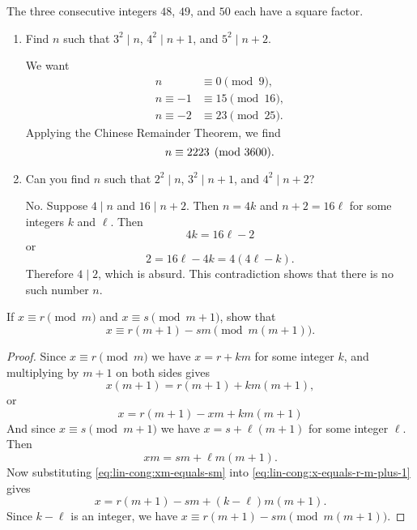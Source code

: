  The three consecutive integers $48$, $49$, and $50$ each
have a square factor.
\begin{enumerate}
\item Find $n$ such that $3^2\mid n$, $4^2\mid n+1$, and
  $5^2\mid n+2$.
  \begin{solution}
    We want
    \begin{align*}
      n&\equiv0\pmod9, \\
      n\equiv-1&\equiv15\pmod{16}, \\
      n\equiv-2&\equiv23\pmod{25}.
    \end{align*}
    Applying the Chinese Remainder Theorem, we find
    \begin{equation*}
      n\equiv2223\pmod{3600}. \qedhere
    \end{equation*}
  \end{solution}
\item Can you find $n$ such that $2^2\mid n$, $3^2\mid n+1$, and
  $4^2\mid n+2$?
  \begin{solution}
    No. Suppose $4\mid n$ and $16\mid n+2$. Then $n = 4k$ and
    $n+2 = 16\ell$ for some integers $k$ and $\ell$. Then
    \begin{equation*}
      4k = 16\ell - 2
    \end{equation*}
    or
    \begin{equation*}
      2 = 16\ell - 4k = 4(4\ell - k).
    \end{equation*}
    Therefore $4\mid 2$, which is absurd. This contradiction shows
    that there is no such number $n$.
  \end{solution}
\end{enumerate}

 If $x\equiv r\pmod{m}$ and $x\equiv s\pmod{m+1}$, show
that
\begin{equation*}
  x\equiv r(m + 1) - sm \pmod{m(m+1)}.
\end{equation*}
\begin{proof}
  Since $x\equiv r\pmod{m}$ we have $x = r + km$ for some integer $k$,
  and multiplying by $m + 1$ on both sides gives
  \begin{equation*}
    x(m + 1) = r(m + 1) + km(m + 1),
  \end{equation*}
  or
  \begin{equation}
    \label{eq:lin-cong:x-equals-r-m-plus-1}
    x = r(m + 1) - xm + km(m + 1)
  \end{equation}
  And since $x\equiv s\pmod{m+1}$ we have $x = s + \ell(m + 1)$ for
  some integer $\ell$. Then
  \begin{equation}
    \label{eq:lin-cong:xm-equals-sm}
    xm = sm + \ell m(m + 1).
  \end{equation}
  Now substituting \eqref{eq:lin-cong:xm-equals-sm} into
  \eqref{eq:lin-cong:x-equals-r-m-plus-1} gives
  \begin{equation*}
    x = r(m + 1) - sm + (k - \ell)m(m + 1).
  \end{equation*}
  Since $k - \ell$ is an integer, we have
  $x\equiv r(m + 1) - sm \pmod{m(m+1)}$.
\end{proof}

